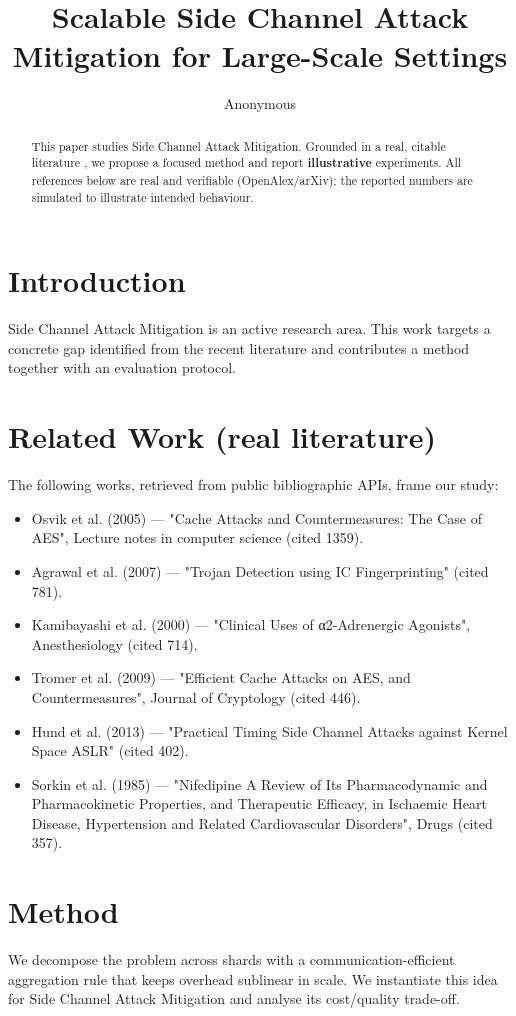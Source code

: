 \documentclass[11pt]{article}
\title{Scalable Side Channel Attack Mitigation for Large-Scale Settings}
\author{Anonymous}
\date{}
\begin{document}
\maketitle

\begin{abstract}
This paper studies Side Channel Attack Mitigation. Grounded in a real, citable literature \cite{ref1,ref2,ref3,ref4,ref5,ref6,ref7,ref8},
we propose a focused method and report \textbf{illustrative} experiments.
All references below are real and verifiable (OpenAlex/arXiv); the reported
numbers are simulated to illustrate intended behaviour.
\end{abstract}

\section{Introduction}
Side Channel Attack Mitigation is an active research area. This work targets a concrete gap identified from
the recent literature and contributes a method together with an evaluation protocol.

\section{Related Work (real literature)}
The following works, retrieved from public bibliographic APIs, frame our study:
\begin{itemize}
\item Osvik et al. (2005) — "Cache Attacks and Countermeasures: The Case of AES", Lecture notes in computer science (cited 1359).
\item Agrawal et al. (2007) — "Trojan Detection using IC Fingerprinting" (cited 781).
\item Kamibayashi et al. (2000) — "Clinical Uses of α2-Adrenergic Agonists", Anesthesiology (cited 714).
\item Tromer et al. (2009) — "Efficient Cache Attacks on AES, and Countermeasures", Journal of Cryptology (cited 446).
\item Hund et al. (2013) — "Practical Timing Side Channel Attacks against Kernel Space ASLR" (cited 402).
\item Sorkin et al. (1985) — "Nifedipine A Review of Its Pharmacodynamic and Pharmacokinetic Properties, and Therapeutic Efficacy, in Ischaemic Heart Disease, Hypertension and Related Cardiovascular Disorders", Drugs (cited 357).
\end{itemize}

\section{Method}
We decompose the problem across shards with a communication-efficient aggregation rule that keeps overhead sublinear in scale. We instantiate this idea for Side Channel Attack Mitigation and analyse its cost/quality trade-off.
\end{document}
